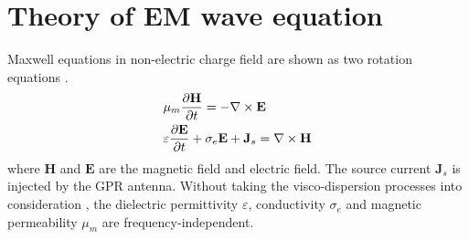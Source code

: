\documentclass[pdftex,a4paper,parskip,listof=totoc,bibliography=totoc,onehalfspacing,12pt]{scrreprt}
\begin{document}
\section{Theory of EM wave equation}
Maxwell equations in non-electric charge field are shown as two rotation equations \citep{irving2006numerical}.
\begin{equation}
\label{eqn:EM}
\begin{aligned}
&\mu_{m} \pdv{ \mathbf{H}}{t} = -\nabla \times \mathbf{E} \\
&\varepsilon \pdv{ \mathbf{E}}{t} + \sigma_{e}\mathbf{E} + \mathbf{J}_s = \nabla \times \mathbf{H} 
\end{aligned}
\end{equation}
where $\mathbf{H}$ and $\mathbf{E}$ are the magnetic field and  electric field. The source current $\mathbf{J}_s$ is injected by the GPR antenna. Without taking the visco-dispersion processes into consideration \citep{qin2020numerical2}, the dielectric permittivity $\varepsilon$, conductivity $\sigma_{e}$ and magnetic permeability $\mu_{m}$ are frequency-independent.
\end{document}

